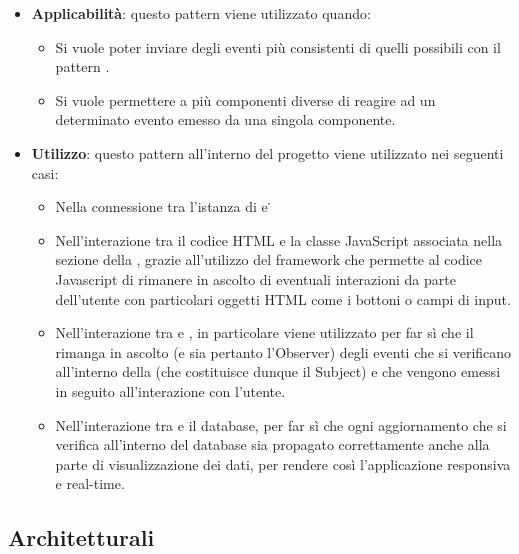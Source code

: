 \begin{itemize}
	\item \textbf{Applicabilità}: questo pattern viene utilizzato quando:
		  \begin{itemize}
		  	 	\item Si vuole poter inviare degli eventi più consistenti di quelli possibili con il pattern .
		  	 	\item Si vuole permettere a più componenti diverse di reagire ad un determinato evento emesso da una singola componente.
		  \end{itemize}
	\item \textbf{Utilizzo}: questo pattern all'interno del progetto viene utilizzato nei seguenti casi:
		  \begin{itemize}
		  		\item Nella connessione tra l'istanza di  e \progettoShort\.
		  		\item Nell'interazione tra il codice HTML e la classe JavaScript associata nella sezione della , grazie all'utilizzo del framework  che permette al codice Javascript di rimanere in ascolto di eventuali interazioni da parte dell'utente con particolari oggetti HTML come i bottoni o campi di input.
		  	 	\item Nell'interazione tra  e , in particolare viene utilizzato per far sì che il  rimanga in ascolto (e sia pertanto l'Observer) degli eventi che si verificano all'interno della  (che costituisce dunque il Subject) e che vengono emessi in seguito all'interazione con l'utente.
		  	 	\item Nell'interazione tra  e il database, per far sì che ogni aggiornamento che si verifica all'interno del database sia propagato correttamente anche alla parte di visualizzazione dei dati, per rendere così l'applicazione responsiva e real-time.
		  \end{itemize}
\end{itemize}

\subsection{Architetturali}
